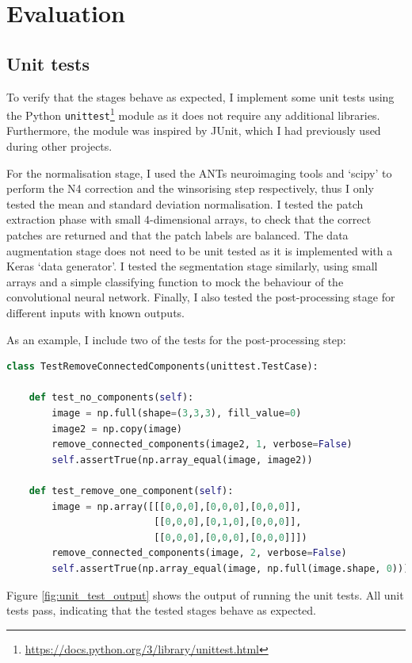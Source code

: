 \documentclass[12pt,a4paper,twoside,openright]{report}
\begin{document}
\chapter{Evaluation}

\section{Unit tests}
To verify that the stages behave as expected, I implement some unit tests using the Python \texttt{unittest}\footnote{\url{https://docs.python.org/3/library/unittest.html}} module as it does not require any additional libraries. Furthermore, the module was inspired by JUnit, which I had previously used during other projects.

 For the normalisation stage, I used the ANTs neuroimaging tools and `scipy' to perform the N4 correction and the winsorising step respectively, thus I only tested the mean and standard deviation normalisation. I tested the patch extraction phase with small 4-dimensional arrays, to check that the correct patches are returned and that the patch labels are balanced. The data augmentation stage does not need to be unit tested as it is implemented with a Keras `data generator'. I tested the segmentation stage similarly, using small arrays and a simple classifying function to mock the behaviour of the convolutional neural network. Finally, I also tested the post-processing stage for different inputs with known outputs.
 
As an example, I include two of the tests for the post-processing step:
\begin{lstlisting}[language=Python]
	class TestRemoveConnectedComponents(unittest.TestCase):

    def test_no_components(self):
        image = np.full(shape=(3,3,3), fill_value=0)
        image2 = np.copy(image)
        remove_connected_components(image2, 1, verbose=False)
        self.assertTrue(np.array_equal(image, image2))
    
    def test_remove_one_component(self):
        image = np.array([[[0,0,0],[0,0,0],[0,0,0]],
                          [[0,0,0],[0,1,0],[0,0,0]],
                          [[0,0,0],[0,0,0],[0,0,0]]])
        remove_connected_components(image, 2, verbose=False)
        self.assertTrue(np.array_equal(image, np.full(image.shape, 0)))
\end{lstlisting}

Figure \ref{fig:unit_test_output} shows the output of running the unit tests. All unit tests pass, indicating that the tested stages behave as expected.
\end{document}
